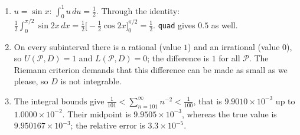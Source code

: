 \begin{enumerate}[label=\textbf{13.\arabic*}]
  \item $u=\sin x$: $\int_{0}^{1}u\,du=\tfrac12$. Through the identity:
        $\tfrac12\int_{0}^{\pi/2}\sin2x\,dx
        =\tfrac12\bigl[-\tfrac12\cos2x\bigr]_{0}^{\pi/2}=\tfrac12$. \texttt{quad}
        gives $0.5$ as well.

  \item On every subinterval there is a rational (value $1$) and an irrational (value
        $0$), so $U(\mathcal{P},D)=1$ and $L(\mathcal{P},D)=0$; the difference is $1$
        for all $\mathcal{P}$. The Riemann criterion demands that this difference can be
        made as small as we please, so $D$ is not integrable.

  \item The integral bounds give $\frac1{101}<\sum_{n=101}^{\infty}n^{-2}
        <\frac1{100}$, that is $9.9010\times10^{-3}$ up to
        $1.0000\times10^{-2}$. Their midpoint is $9.9505\times10^{-3}$,
        whereas the true value is $9.950167\times10^{-3}$; the relative error is
        $3.3\times10^{-5}$.
\end{enumerate}

